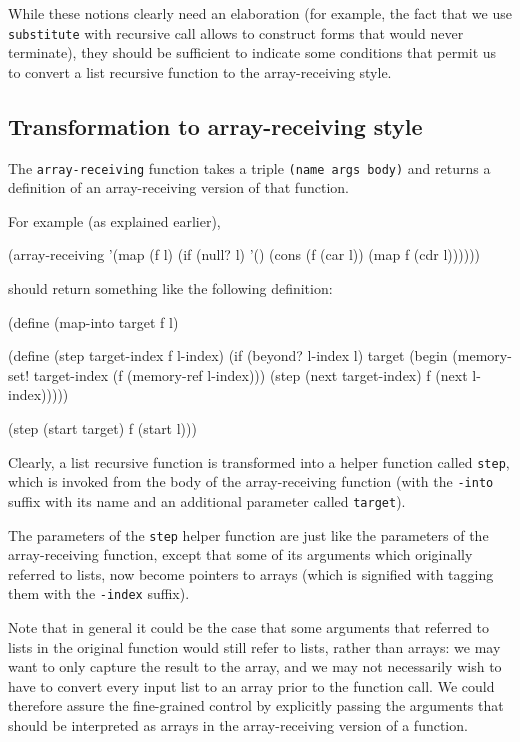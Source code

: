 While these notions clearly need an elaboration (for example,
the fact that we use \texttt{substitute} with recursive call
allows to construct forms that would never terminate), they should
be sufficient to indicate some conditions that permit us to
convert a list recursive function to the array-receiving style.

\subsection{Transformation to array-receiving style}

The \texttt{array-receiving} function takes a triple \texttt{(name args body)}
and returns a definition of an array-receiving version of that function.

For example (as explained earlier),

\begin{Snippet}
   (array-receiving '(map (f l)
		          (if (null? l)
			    '()
			    (cons (f (car l))
			 	  (map f (cdr l))))))
\end{Snippet}

should return something like the following definition:

\begin{Snippet}
  (define (map-into target f l)
\end{Snippet}
\begin{Snippet}  
    (define (step target-index f l-index)
      (if (beyond? l-index l)
        target
        (begin
          (memory-set! target-index (f (memory-ref l-index)))
          (step (next target-index) f (next l-index)))))
\end{Snippet}
\begin{Snippet}
    (step (start target) f (start l)))
\end{Snippet}

Clearly, a list recursive function is transformed into a helper
function called \texttt{step}, which is invoked from the body
of the array-receiving function (with the \texttt{-into} suffix
with its name and an additional parameter called \texttt{target}).

The parameters of the \texttt{step} helper function are just like
the parameters of the array-receiving function, except that some
of its arguments which originally referred to lists, now become
pointers to arrays (which is signified with tagging them with
the \texttt{-index} suffix).

Note that in general it could be the case that some arguments
that referred to lists in the original function would still refer to lists,
rather than arrays: we may want to only capture the result to the array,
and we may not necessarily wish to have to convert every input list
to an array prior to the function call. We could therefore assure the
fine-grained control by explicitly passing the arguments that should
be interpreted as arrays in the array-receiving version of a function.

